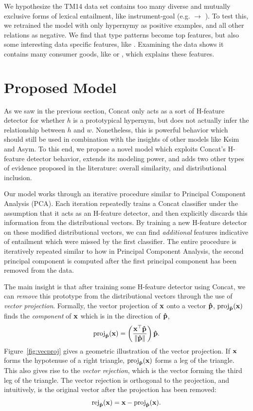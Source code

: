We hypothesize the TM14 data set contains too many diverse and mutually
exclusive forms of lexical entailment, like instrument-goal (e.g. 
$\rightarrow$ ).  To test this, we retrained the model with only
hypernymy as positive examples, and all other relations as negative.  We find
that  type patterns become top features, but also some interesting
data specific features, like .  Examining the data
shows it contains many consumer goods, like  or ,
which explains these features.


\section{Proposed Model}

As we saw in the previous section, Concat only acts as a sort of H-feature
detector for whether $h$ is a prototypical hypernym, but does not actually
infer the relationship between $h$ and $w$. Nonetheless, this is powerful
behavior which should still be used in combination with the insights of other
models like Ksim and Asym. To this end, we propose a novel model which exploits
Concat's H-feature detector behavior, extends its modeling power, and adds two
other types of evidence proposed in the literature: overall similarity, and
distributional inclusion.

Our model works through an iterative procedure similar to Principal Component
Analysis (PCA). Each iteration repeatedly trains a Concat classifier under the
assumption that it acts as an H-feature detector, and then explicitly discards
this information from the distributional vectors. By training a new H-feature
detector on these modified distributional vectors, we can find {\em additional}
features indicative of entailment which were missed by the first classifier.
The entire procedure is iteratively repeated similar to how in Principal
Component Analysis, the second principal component is computed after the first
principal component has been removed from the data.

The main insight is that after training some H-feature detector using Concat,
we can {\em remove} this prototype from the distributional vectors through
the use of {\em vector projection}.
Formally, the vector projection of ${\mathbf{x}}$ onto
a vector ${\mathbf{\hat p}}$, $\text{proj}_{{\mathbf{\hat p}}}({\mathbf{x}})$ finds the {\em component} of ${\mathbf{x}}$
which is in the direction of ${\mathbf{\hat p}}$,
\begin{equation*}
  \text{proj}_{{\mathbf{\hat p}}}({\mathbf{x}}) = \left(\frac{{\mathbf{x}}^{\top}{\mathbf{\hat p}}}{\|{\mathbf{\hat p}}\|}\right){\mathbf{\hat p}}.
\end{equation*}
Figure~\ref{fig:vecproj} gives a geometric illustration of the vector
projection. If ${\mathbf{x}}$ forms the hypotenuse of a right
triangle, $\text{proj}_{{\mathbf{\hat p}}}({\mathbf{x}})$ forms a leg of the triangle. This also
gives rise to the {\em vector rejection}, which is the vector forming the third
leg of the triangle. The vector rejection is orthogonal to the projection, and
intuitively, is the original vector after the projection has been removed:
\begin{equation*}
  \text{rej}_{{\mathbf{\hat p}}}({\mathbf{x}}) = {\mathbf{x}} - \text{proj}_{{\mathbf{\hat p}}}({\mathbf{x}}).
\end{equation*}

